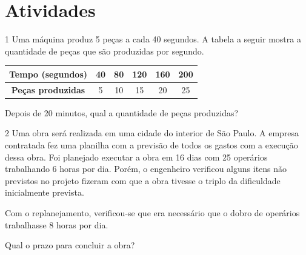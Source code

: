 \section{Atividades}

\num{1} Uma máquina produz 5 peças a cada 40 segundos. A tabela a seguir
mostra a quantidade de peças que são produzidas por segundo.

\begin{center}
\begin{tabular}{|c ccccc|}
\hline
\textbf{Tempo (segundos)} & 40 & 80 & 120 & 160 & 200 \\ \hline
\textbf{Peças produzidas} & 5 & 10 & 15 & 20 & 25 \\ \hline
\end{tabular}
\end{center}

Depois de 20 minutos, qual a quantidade de peças produzidas?

\begin{emptybox}
\end{emptybox}

\num{2} Uma obra será realizada em uma cidade do interior de São Paulo. A
empresa contratada fez uma planilha com a previsão de todos os gastos
com a execução dessa obra. Foi planejado executar a obra em 16 dias com
25 operários trabalhando 6 horas por dia. Porém, o engenheiro verificou
alguns itens não previstos no projeto fizeram com que a obra tivesse o
triplo da dificuldade inicialmente prevista.

Com o replanejamento, verificou-se que era necessário que o dobro de
operários trabalhasse 8 horas por dia.

Qual o prazo para concluir a obra?

\begin{emptybox}
\end{emptybox}

